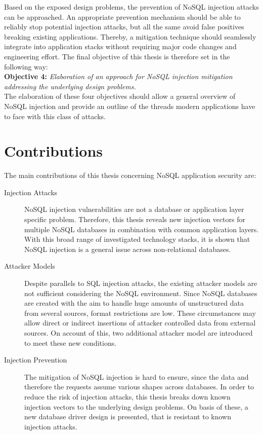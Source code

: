Based on the exposed design problems, the prevention of NoSQL injection attacks can be approached. An appropriate prevention mechanism should be able to reliably stop potential injection attacks, but all the same avoid false positives breaking existing applications. Thereby, a mitigation technique should seamlessly integrate into application stacks without requiring major code changes and engineering effort. The final objective of this thesis is therefore set in the following way:\\

\textbf{Objective 4:} \textit{Elaboration of an approach for NoSQL injection mitigation addressing the underlying design problems.} \\

The elaboration of these four objectives should allow a general overview of NoSQL injection and provide an outline of the threads modern applications have to face with this class of attacks. \\


\section{Contributions}

The main contributions of this thesis concerning NoSQL application security are:
\begin{description}
\item [Injection Attacks] NoSQL injection vulnerabilities are not a database or application layer specific problem. Therefore, this thesis reveals new injection vectors for multiple NoSQL databases in combination with common application layers. With this broad range of investigated technology stacks, it is shown that NoSQL injection is a general issue across non-relational databases.
\item [Attacker Models] Despite parallels to SQL injection attacks, the existing attacker models are not sufficient considering the NoSQL environment. Since NoSQL databases are created with the aim to handle huge amounts of unstructured data from several sources, format restrictions are low. These circumstances may allow direct or indirect insertions of attacker controlled data from external sources. On account of this, two additional attacker model are introduced to meet these new conditions.
\item [Injection Prevention] The mitigation of NoSQL injection is hard to ensure, since the data and therefore the requests assume various shapes across databases. In order to reduce the risk of injection attacks, this thesis breaks down known injection vectors to the underlying design problems. On basis of these, a new database driver design is presented, that is resistant to known injection attacks.
\end{description}

